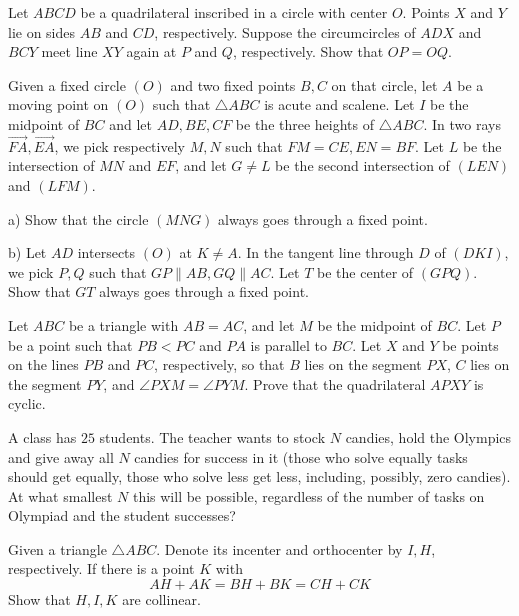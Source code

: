 \documentclass[11pt]{scrartcl}
\begin{document}
\begin{problem}[4603228855421380865]
	Let $ABCD$ be a quadrilateral inscribed in a circle with center $O$. Points $X$ and $Y$ lie on sides $AB$ and $CD$, respectively. Suppose the circumcircles of $ADX$ and $BCY$ meet line $XY$ again at $P$ and $Q$, respectively. Show that $OP=OQ$.
\end{problem}
\begin{problem}[5990443173263547430]
	Given a fixed circle $(O)$ and two fixed points $B, C$ on that circle, let $A$ be a moving point on $(O)$ such that $\triangle ABC$ is acute and scalene. Let $I$ be the midpoint of $BC$ and let $AD, BE, CF$ be the three heights of $\triangle ABC$. In two rays $\overrightarrow{FA}, \overrightarrow{EA}$, we pick respectively $M,N$ such that $FM = CE, EN = BF$. Let $L$ be the intersection of $MN$ and $EF$, and let $G \neq L$ be the second intersection of $(LEN)$ and $(LFM)$.

a) Show that the circle $(MNG)$ always goes through a fixed point.

b) Let $AD$ intersects $(O)$ at $K \neq A$. In the tangent line through $D$ of $(DKI)$, we pick $P,Q$ such that $GP \parallel AB, GQ \parallel AC$. Let $T$ be the center of $(GPQ)$. Show that $GT$ always goes through a fixed point.
\end{problem}
\begin{problem}[883811987981100]
Let $ABC$ be a triangle with $AB=AC$, and let $M$ be the midpoint of $BC$. Let $P$ be a point such that $PB<PC$ and $PA$ is parallel to $BC$. Let $X$ and $Y$ be points on the lines $PB$ and $PC$, respectively, so that $B$ lies on the segment $PX$, $C$ lies on the segment $PY$, and $\angle PXM=\angle PYM$. Prove that the quadrilateral $APXY$ is cyclic.
\end{problem}
\begin{problem}[458902414604417]
	A class has $25$ students. The teacher wants to stock $N$ candies, hold the Olympics and give away all $N$ candies for success in it (those who solve equally tasks should get equally, those who solve less get less, including, possibly, zero candies). At what smallest $N$ this will be possible, regardless of the number of tasks on Olympiad and the student successes?
\end{problem}
\begin{problem}[3906812380515301028]
Given a triangle $ \triangle ABC $. Denote its incenter and orthocenter by $ I, H $, respectively. If there is a point $ K $ with$$ AH+AK = BH+BK = CH+CK $$Show that $ H, I, K $ are collinear.
\end{problem}
\end{document}
